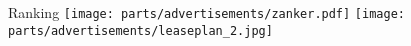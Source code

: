 \subtitle{Lehrer}{Ranking}
\texttt{[image: parts/advertisements/zanker.pdf]}
\vfill
\texttt{[image: parts/advertisements/leaseplan\_2.jpg]}
